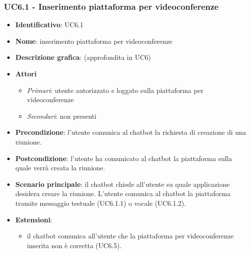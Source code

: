 \subsubsection{UC6.1 - Inserimento piattaforma per videoconferenze}
\begin{itemize}
    \item \textbf{Identificativo}: UC6.1
    \item \textbf{Nome}: inserimento piattaforma per videoconferenze
    \item \textbf{Descrizione grafica}: (approfondita in UC6)
    \item \textbf{Attori}
 \begin{itemize} 
    \item \textit{Primari}: utente autorizzato e loggato sulla piattaforma per videoconferenze
    \item \textit{Secondari}: non presenti
 \end{itemize}
 \item \textbf{Precondizione}: l'utente comunica al chatbot la richiesta di creazione di una riunione.
 \item \textbf{Postcondizione}: l'utente ha comunicato al chatbot la piattaforma sulla quale verrà creata la riunione.
 \item \textbf{Scenario principale}: il chatbot chiede all'utente su quale applicazione desidera creare la riunione. L'utente comunica al chatbot la piattaforma tramite messaggio testuale (UC6.1.1) o vocale (UC6.1.2).
 \item \textbf{Estensioni}: 
 \begin{itemize} 
    \item il chatbot comunica all'utente che la piattaforma per videoconferenze inserita non è corretta (UC6.5).
 \end{itemize}
\end{itemize}

